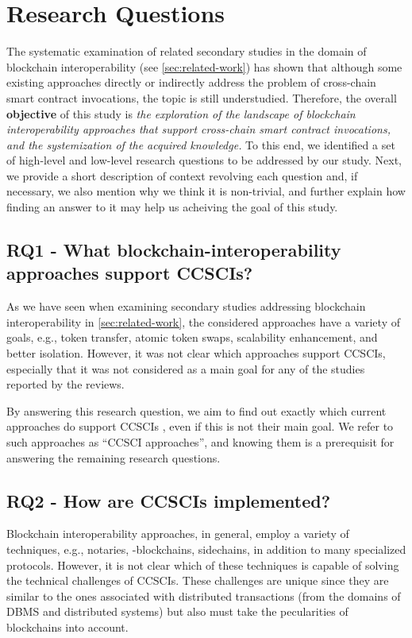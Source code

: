 \documentclass[review]{elsarticle}
\begin{document}
\section{Research Questions}
\label{sec:research-questions}
The systematic examination of related secondary studies in the domain of blockchain interoperability (see \cref{sec:related-work}) has shown that although some existing approaches directly or indirectly address the problem of cross-chain smart contract invocations, the topic is still understudied.
Therefore, the overall \textbf{objective} of this study is \textit{the exploration of the landscape of blockchain interoperability approaches that support cross-chain smart contract invocations, and the systemization of the acquired knowledge.}
To this end, we identified a set of high-level and low-level research questions to be addressed by our study.
Next, we provide a short description of context revolving each question and, if necessary, we also mention why we think it is non-trivial, and further explain how finding an answer to it may help us acheiving the goal of this study.

\subsection*{RQ1 - What blockchain-interoperability approaches support CCSCIs?}
As we have seen when examining secondary studies addressing blockchain interoperability in \cref{sec:related-work}, the considered approaches have a variety of goals, e.g., token transfer, atomic token swaps, scalability enhancement, and better isolation.
However, it was not clear which approaches support CCSCIs, especially that it was not considered as a main goal for any of the studies reported by the reviews.

By answering this research question, we aim to find out exactly which current approaches do support CCSCIs %
, even if this is not their main goal.
We refer to such approaches as \enquote{CCSCI approaches}, and knowing them is a prerequisit for answering the remaining research questions.

\subsection*{RQ2 - How are CCSCIs implemented?}
Blockchain interoperability approaches, in general, employ a variety of techniques, e.g., notaries, -blockchains, sidechains, in addition to many specialized protocols.
However, it is not clear which of these techniques is capable of solving the technical challenges of CCSCIs.
These challenges are unique since they are similar to the ones associated with distributed transactions (from the domains of DBMS and distributed systems) but also must take the pecularities of blockchains into account.
\end{document}
